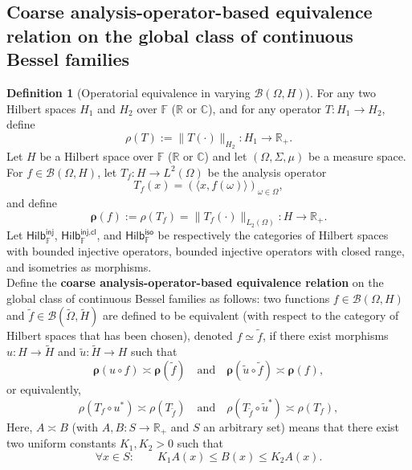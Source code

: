 \documentclass[a4paper,10pt]{article}
\theoremstyle{plain}
\theoremstyle{definition}
\newtheorem{definition}[theorem]{Definition}
\theoremstyle{remark}
\begin{document}
\subsection{Coarse analysis-operator-based equivalence relation on the global class of continuous Bessel families}

\begin{definition}[Operatorial equivalence in varying $\mathsf{\mathcal{B}}(\Omega,H)$]
  \label{definition-operatorial-equivalence}
  For any two Hilbert spaces $H_1$ and $H_2$ over $\mathbb{F}$ ($\mathbb{R}$ or $\mathbb{C}$), and for any operator $T : H_1 \to H_2$, define
  \[ \rho(T) := \lVert T(\cdot) \rVert_{H_2} : H_1 \to \mathbb{R}_+. \]
  Let $H$ be a Hilbert space over $\mathbb{F}$ ($\mathbb{R}$ or $\mathbb{C}$) and let $(\Omega,\Sigma,\mu)$ be a measure space.\\
  For $f \in \mathsf{\mathcal{B}}(\Omega,H)$, let $T_f : H \to L^2(\Omega)$ be the analysis operator
  \[
    T_f(x) = (\langle x, f(\omega) \rangle)_{\omega \in \Omega},
  \]
  and define
  \[
    \boldsymbol{\rho}(f) := \rho(T_f) = \|T_f(\cdot)\|_{L_2(\Omega)} : H \to \mathbb{R}_+.
  \]
  Let $\mathsf{Hilb_{\mathbb{F}}^{\text{inj}}}$, $\mathsf{Hilb_{\mathbb{F}}^{\text{inj,cl}}}$, and $\mathsf{Hilb_{\mathbb{F}}^{\text{iso}}}$ be respectively the categories of Hilbert spaces with bounded injective operators, bounded injective operators with closed range, and isometries as morphisms. \\
  Define the \textbf{coarse analysis-operator-based equivalence relation} on the global class of continuous Bessel families as follows: two functions $f \in \mathsf{\mathcal{B}}(\Omega,H)$ and $\tilde{f} \in \mathsf{\mathcal{B}}(\tilde{\Omega},\tilde{H})$ are defined to be equivalent (with respect to the category of Hilbert spaces that has been chosen), denoted $f \simeq \tilde{f}$, if there exist morphisms $u : H \to \tilde{H}$ and $\tilde{u} : \tilde{H} \to H$ such that
  \[
    \boldsymbol{\rho}(u \circ f) \asymp \boldsymbol{\rho}(\tilde{f}) \quad \text{and} \quad \boldsymbol{\rho}(\tilde{u} \circ \tilde{f}) \asymp \boldsymbol{\rho}(f),
  \]
  or equivalently,
  \[
    \rho(T_f \circ u^*) \asymp \rho(T_{\tilde{f}}) \quad \text{and} \quad \rho(T_{\tilde{f}} \circ \tilde{u}^*) \asymp \rho(T_f),
  \]
  Here, $A \asymp B$ (with $A,B : S \to \mathbb{R}_+$ and $S$ an arbitrary set) means that there exist two uniform constants $K_1,K_2>0$ such that
  \[ \forall x \in S : \quad \quad K_1 A(x) \leq B(x) \leq K_2 A(x). \]
\end{definition}
\end{document}

